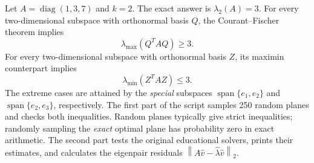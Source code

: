 \documentclass[14pt,letterpaper]{article}
\theoremstyle{plain}
\theoremstyle{definition}
\theoremstyle{remark}
\newcommand{\norm}[1]{\left\lVert #1 \right\rVert}
\DeclareMathOperator{\diag}{diag}
\DeclareMathOperator{\Span}{span}
\begin{document}
Let $A=\diag(1,3,7)$ and $k=2$. The exact answer is
$\lambda_2(A)=3$. For every two-dimensional subspace
with orthonormal basis $Q$, the Courant--Fischer theorem
implies
\[
\boxed{\lambda_{\max}(Q^TAQ)\geq3.}
\]
For every two-dimensional subspace with orthonormal
basis $Z$, its maximin counterpart implies
\[
\boxed{\lambda_{\min}(Z^TAZ)\leq3.}
\]
The extreme cases are attained by the \emph{special}
subspaces $\Span\{e_1,e_2\}$ and
$\Span\{e_2,e_3\}$, respectively. The first part
of the script samples 250 random planes and checks
both inequalities. Random planes typically give
strict inequalities; randomly sampling the \emph{exact}
optimal plane has probability zero in exact arithmetic.
The second part tests the original educational solvers,
prints their estimates, and calculates the eigenpair
residuals $\norm{A\widehat v-\widehat\lambda\widehat v}_2$.
\end{document}
